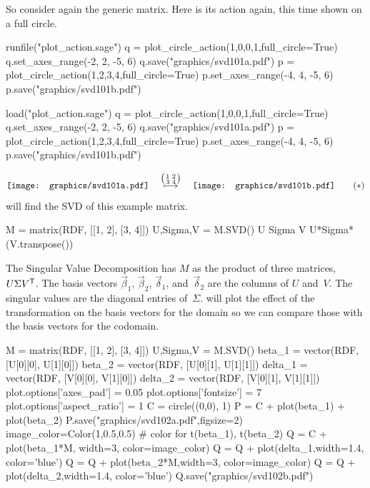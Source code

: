 So consider again the generic matrix.
Here is its action again, this time shown
on a full circle.
\begin{sageoutput}[d,0,4;d,5,7]
runfile("plot_action.sage")
q = plot_circle_action(1,0,0,1,full_circle=True) 
q.set_axes_range(-2, 2, -5, 6) 
q.save("graphics/svd101a.pdf")
p = plot_circle_action(1,2,3,4,full_circle=True) 
p.set_axes_range(-4, 4, -5, 6) 
p.save("graphics/svd101b.pdf")
\end{sageoutput}
\begin{sagesilent}
load("plot_action.sage")
q = plot_circle_action(1,0,0,1,full_circle=True) 
q.set_axes_range(-2, 2, -5, 6) 
q.save("graphics/svd101a.pdf")
p = plot_circle_action(1,2,3,4,full_circle=True) 
p.set_axes_range(-4, 4, -5, 6) 
p.save("graphics/svd101b.pdf")
\end{sagesilent}
\begin{equation*}
  \vcenteredhbox{\texttt{[image: graphics/svd101a.pdf]}}
  \quad\mapsunder{\big (\begin{smallmatrix} 1 &2 \\ 3 &4 \end{smallmatrix}\big )}\quad
  \vcenteredhbox{\texttt{[image: graphics/svd101b.pdf]}}
  \tag{$*$}
\end{equation*}
\Sage{} will find the SVD of this example matrix.
\begin{sageoutput}
M = matrix(RDF, [[1, 2], [3, 4]])
U,Sigma,V = M.SVD()
U
Sigma
V
U*Sigma*(V.transpose())
\end{sageoutput}
\noindent 
The Singular Value Decomposition has $M$ as the product of
three matrices, $U\Sigma{{V}^{\mathsf{T}}}$.
The basis vectors $\vec{\beta}_1$, $\vec{\beta}_2$, $\vec{\delta}_1$, 
and~$\vec{\delta}_2$ are the columns of $U$ and~$V$. 
The singular values are the diagonal entries of~$\Sigma$.
\Sage{} will plot the effect of the transformation
on the basis vectors for the domain so we can compare those with the
basis vectors for the codomain.
\begin{sageoutput}[d,0,2;d,6,10]
M = matrix(RDF, [[1, 2], [3, 4]])
U,Sigma,V = M.SVD()
beta_1 = vector(RDF, [U[0][0], U[1][0]])
beta_2 = vector(RDF, [U[0][1], U[1][1]])
delta_1 = vector(RDF, [V[0][0], V[1][0]])
delta_2 = vector(RDF, [V[0][1], V[1][1]])
plot.options['axes_pad'] = 0.05
plot.options['fontsize'] = 7
plot.options['aspect_ratio'] = 1
C = circle((0,0), 1)
P = C + plot(beta_1) + plot(beta_2)
P.save("graphics/svd102a.pdf",figsize=2)
image_color=Color(1,0.5,0.5)   # color for t(beta_1), t(beta_2)
Q = C + plot(beta_1*M, width=3, color=image_color) 
Q = Q + plot(delta_1,width=1.4, color='blue') 
Q = Q + plot(beta_2*M,width=3, color=image_color) 
Q = Q + plot(delta_2,width=1.4, color='blue')
Q.save("graphics/svd102b.pdf")
\end{sageoutput}
